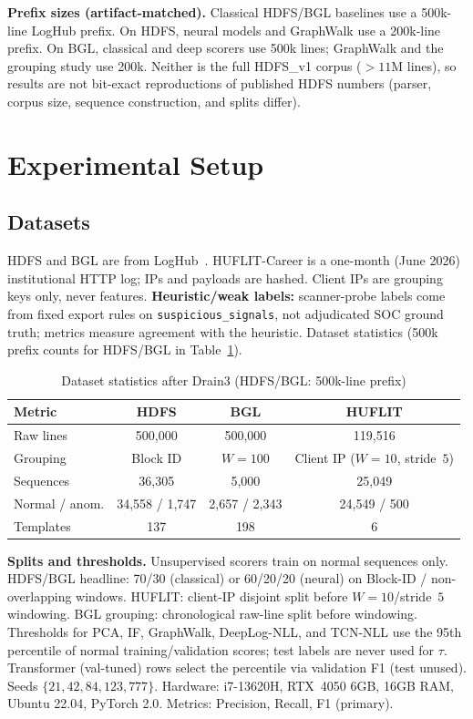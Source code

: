 \documentclass[runningheads]{llncs}
\begin{document}
\textbf{Prefix sizes (artifact-matched).} Classical HDFS/BGL baselines use a 500k-line LogHub prefix. On HDFS, neural models and GraphWalk use a 200k-line prefix. On BGL, classical and deep scorers use 500k lines; GraphWalk and the grouping study use 200k. Neither is the full HDFS\_v1 corpus ($>11$M lines), so results are not bit-exact reproductions of published HDFS numbers (parser, corpus size, sequence construction, and splits differ).

\section{Experimental Setup}
\subsection{Datasets}
HDFS and BGL are from LogHub~\cite{b6,b12}. HUFLIT-Career is a one-month (June 2026) institutional HTTP log; IPs and payloads are hashed. Client IPs are grouping keys only, never features. \textbf{Heuristic/weak labels:} scanner-probe labels come from fixed export rules on \texttt{suspicious\_signals}, not adjudicated SOC ground truth; metrics measure agreement with the heuristic. Dataset statistics (500k prefix counts for HDFS/BGL in Table~\ref{tab_dataset_stats}).

\begin{table}[htbp]
\caption{Dataset statistics after Drain3 (HDFS/BGL: 500k-line prefix)}
\centering
\scriptsize
\begin{tabular}{lccc}
\toprule
\textbf{Metric} & \textbf{HDFS} & \textbf{BGL} & \textbf{HUFLIT} \\
\midrule
Raw lines & 500,000 & 500,000 & 119,516 \\
Grouping & Block ID & $W{=}100$ & Client IP ($W{=}10$, stride~$5$) \\
Sequences & 36,305 & 5,000 & 25,049 \\
Normal / anom. & 34,558 / 1,747 & 2,657 / 2,343 & 24,549 / 500 \\
Templates & 137 & 198 & 6 \\
\bottomrule
\end{tabular}
\label{tab_dataset_stats}
\end{table}

\textbf{Splits and thresholds.} Unsupervised scorers train on normal sequences only. HDFS/BGL headline: 70/30 (classical) or 60/20/20 (neural) on Block-ID / non-overlapping windows. HUFLIT: client-IP disjoint split before $W{=}10$/stride~$5$ windowing. BGL grouping: chronological raw-line split before windowing. Thresholds for PCA, IF, GraphWalk, DeepLog-NLL, and TCN-NLL use the 95th percentile of normal training/validation scores; test labels are never used for $\tau$. Transformer (val-tuned) rows select the percentile via validation F1 (test unused). Seeds $\{21,42,84,123,777\}$. Hardware: i7-13620H, RTX~4050 6GB, 16GB RAM, Ubuntu 22.04, PyTorch 2.0. Metrics: Precision, Recall, F1 (primary).
\end{document}
